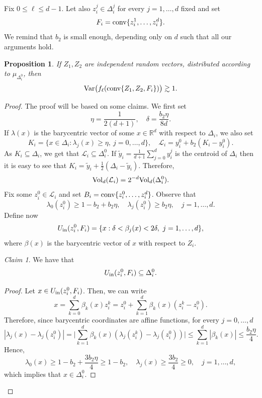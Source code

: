 \documentclass[10pt]{amsart}
\newcommand{\1}{\textbf{1}}
\newcommand{\conv}{{\rm conv}}
\newcommand{\vol}{{\rm Vol}}
\newcommand{\Var}{{\rm Var}}
\numberwithin{equation}{section} %
\newtheorem{proposition}[theorem]{Proposition}
\theoremstyle{remark}
\newtheorem{claim}{Claim}
\theoremstyle{definition}
\begin{document}
Fix $0 \leq \ell \leq d-1$. Let also $z_i^j \in \Delta_i^j$ for every $j=1,\ldots,d$ fixed and set \[F_i=\conv\{z_i^1,\ldots,z_i^d\}.\] 
We remind that $b_2$ is small enough, depending only on $d$ such that all our arguments hold.

\begin{proposition}\label{prop:partial-faces-lower-bound}
    If $Z_1,Z_2$ are independent random vectors, distributed according to $\mu_{\Delta_i^0}$, then \[\Var\bigl(f_\ell(\conv\{Z_1,Z_2,F_i\})\bigr) \gtrsim1.\] 
\end{proposition}

\begin{proof}
The proof will be based on some claims. We first set  \[\eta=\frac{1}{2(d+1)}, \quad \delta=\frac{b_2\eta}{8d}.\]If $\lambda(x)$ is the barycentric vector of some $x \in \mathbb{R}^d$ with respect to $\Delta_i$, we also set  \[K_i=\{x \in \Delta_i:\lambda_j(x) \geq \eta, \ j=0,\ldots,d\}, \quad \mathcal{L}_i=y_i^0+b_2(K_i-y_i^0).\]
As $K_i \subseteq \Delta_i$, we get that $\mathcal{L}_i\subseteq \Delta_i^0$. If $\tilde{y}_i=\frac{1}{d+1}\sum_{j=0}^d y_i^j$ is the centroid of $\Delta_i$ then it is easy to see that $K_i=\tilde{y}_i+\frac{1}{2}(\Delta_i-\tilde{y}_i)$. Therefore, \begin{equation}\label{eq:L-volume-comparable}\vol_d(\mathcal{L}_i)=2^{-d}\vol_d(\Delta_i^0).\end{equation} Fix some $z_i^0 \in \mathcal{L}_i$ and set $B_i=\conv\{z_i^0,\ldots,z_i^d\}$. Observe that \[\lambda_0(z_i^0) \geq1-b_2+b_2\eta, \quad \lambda_j(z_i^0) \geq b_2\eta, \quad j=1,\ldots,d.\] Define now \[U_{\rm in}(z_i^0,F_i)=\{x:\delta<\beta_j(x)<2\delta, \ j=1,\ldots, d\},\] where $\beta(x)$ is the barycentric vector of $x$ with respect to $Z_i$. 

\begin{claim}\label{claim:Uin-subset}
    We have that \[ U_{\rm in}(z_i^0,F_i) \subseteq \Delta_i^0.\]
\end{claim}

\begin{proof}
Let $x \in U_{\rm in}(z_i^0,F_i)$. Then, we can write \[x=\sum_{k=0}^{d}\beta_k(x)z_i^k=z_i^0+\sum_{k=1}^d\beta_k(x)(z_i^k-z_i^0).\] Therefore, since barycentric coordinates are affine functions, for every $j=0,\ldots,d$
\[
    |\lambda_j(x)-\lambda_j(z_i^0)|=\biggl|\sum_{k=1}^{d}\beta_k(x)(\lambda_j(z_i^k)-\lambda_j(z_i^0))\biggr| \leq \sum_{k=1}^d|\beta_k(x)| \leq \frac{b_2\eta}{4}.
\] Hence,
\[\lambda_0(x) \geq 1-b_2+\frac{3b_2\eta}{4} \geq 1-b_2, \quad \lambda_j(x) \geq \frac{3b_2}{4}\geq 0, \quad j=1,\ldots,d,\] which implies that $x \in \Delta_i^0$.   
\end{proof}


\end{proof}
\end{document}

